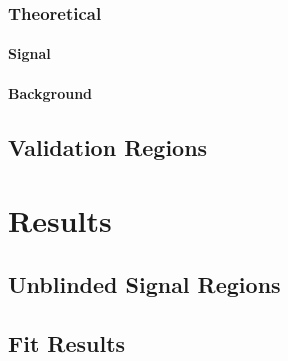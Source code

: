 \subsection{Theoretical}
\subsubsection{Signal}
\subsubsection{Background}
\label{sec:sys_theorybkg}

\section{Validation Regions}


\chapter{Results}
\section{Unblinded Signal Regions}


\section{Fit Results}

